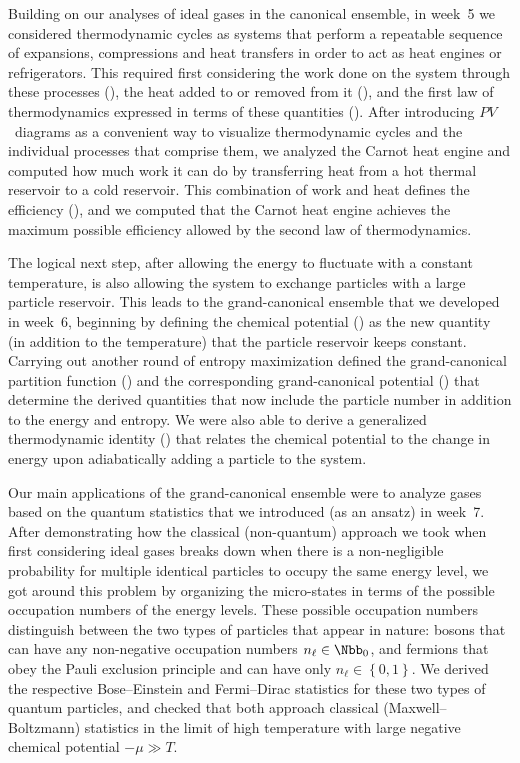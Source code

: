 Building on our analyses of ideal gases in the canonical ensemble, in week~5 we considered thermodynamic cycles as systems that perform a repeatable sequence of expansions, compressions and heat transfers in order to act as heat engines or refrigerators.
This required first considering the work done on the system through these processes (), the heat added to or removed from it (), and the first law of thermodynamics expressed in terms of these quantities ().
After introducing $PV$~diagrams as a convenient way to visualize thermodynamic cycles and the individual processes that comprise them, we analyzed the Carnot heat engine and computed how much work it can do by transferring heat from a hot thermal reservoir to a cold reservoir.
This combination of work and heat defines the efficiency (), and we computed that the Carnot heat engine achieves the maximum possible efficiency allowed by the second law of thermodynamics.

The logical next step, after allowing the energy to fluctuate with a constant temperature, is also allowing the system to exchange particles with a large particle reservoir.
This leads to the grand-canonical ensemble that we developed in week~6, beginning by defining the chemical potential () as the new quantity (in addition to the temperature) that the particle reservoir keeps constant.
Carrying out another round of entropy maximization defined the grand-canonical partition function () and the corresponding grand-canonical potential () that determine the derived quantities that now include the particle number in addition to the energy and entropy.
We were also able to derive a generalized thermodynamic identity () that relates the chemical potential to the change in energy upon adiabatically adding a particle to the system.

Our main applications of the grand-canonical ensemble were to analyze gases based on the quantum statistics that we introduced (as an ansatz) in week~7.
After demonstrating how the classical (non-quantum) approach we took when first considering ideal gases breaks down when there is a non-negligible probability for multiple identical particles to occupy the same energy level, we got around this problem by organizing the micro-states in terms of the possible occupation numbers of the energy levels.
These possible occupation numbers distinguish between the two types of particles that appear in nature: bosons that can have any non-negative occupation numbers $n_{\ell} \in \Nbb_0$, and fermions that obey the Pauli exclusion principle and can have only $n_{\ell} \in \left\{0, 1\right\}$.
We derived the respective Bose--Einstein and Fermi--Dirac statistics for these two types of quantum particles, and checked that both approach classical (Maxwell--Boltzmann) statistics in the limit of high temperature with large negative chemical potential $-\mu \gg T$.

